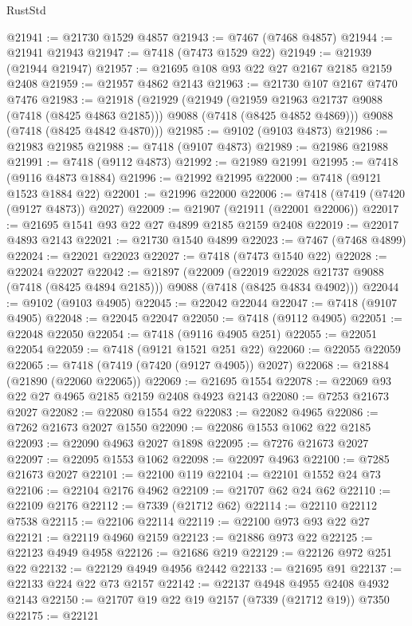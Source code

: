 \begin{lexlean}{RustStd}
\begin{coremodule}
@21941 := @21730 @1529 @4857
@21943 := @7467 (@7468 @4857)
@21944 := @21941 @21943
@21947 := @7418 (@7473 @1529 @22)
@21949 := @21939 (@21944 @21947)
@21957 := @21695 @108 @93 @22 @27 @2167 @2185 @2159 @2408
@21959 := @21957 @4862 @2143
@21963 := @21730 @107 @2167 @7470 @7476
@21983 := @21918
    (@21929
      (@21949
        (@21959 @21963 @21737 @9088 (@7418 (@8425 @4863 @2185)))
        @9088
        (@7418 (@8425 @4852 @4869)))
      @9088
      (@7418 (@8425 @4842 @4870)))
@21985 := @9102 (@9103 @4873)
@21986 := @21983 @21985
@21988 := @7418 (@9107 @4873)
@21989 := @21986 @21988
@21991 := @7418 (@9112 @4873)
@21992 := @21989 @21991
@21995 := @7418 (@9116 @4873 @1884)
@21996 := @21992 @21995
@22000 := @7418 (@9121 @1523 @1884 @22)
@22001 := @21996 @22000
@22006 := @7418 (@7419 (@7420 (@9127 @4873)) @2027)
@22009 := @21907 (@21911 (@22001 @22006))
@22017 := @21695 @1541 @93 @22 @27 @4899 @2185 @2159 @2408
@22019 := @22017 @4893 @2143
@22021 := @21730 @1540 @4899
@22023 := @7467 (@7468 @4899)
@22024 := @22021 @22023
@22027 := @7418 (@7473 @1540 @22)
@22028 := @22024 @22027
@22042 := @21897
    (@22009
      (@22019 @22028 @21737 @9088 (@7418 (@8425 @4894 @2185)))
      @9088
      (@7418 (@8425 @4834 @4902)))
@22044 := @9102 (@9103 @4905)
@22045 := @22042 @22044
@22047 := @7418 (@9107 @4905)
@22048 := @22045 @22047
@22050 := @7418 (@9112 @4905)
@22051 := @22048 @22050
@22054 := @7418 (@9116 @4905 @251)
@22055 := @22051 @22054
@22059 := @7418 (@9121 @1521 @251 @22)
@22060 := @22055 @22059
@22065 := @7418 (@7419 (@7420 (@9127 @4905)) @2027)
@22068 := @21884 (@21890 (@22060 @22065))
@22069 := @21695 @1554
@22078 := @22069 @93 @22 @27 @4965 @2185 @2159 @2408 @4923 @2143
@22080 := @7253 @21673 @2027
@22082 := @22080 @1554 @22
@22083 := @22082 @4965
@22086 := @7262 @21673 @2027 @1550
@22090 := @22086 @1553 @1062 @22 @2185
@22093 := @22090 @4963 @2027 @1898
@22095 := @7276 @21673 @2027
@22097 := @22095 @1553 @1062
@22098 := @22097 @4963
@22100 := @7285 @21673 @2027
@22101 := @22100 @119
@22104 := @22101 @1552 @24 @73
@22106 := @22104 @2176 @4962
@22109 := @21707 @62 @24 @62
@22110 := @22109 @2176
@22112 := @7339 (@21712 @62)
@22114 := @22110 @22112 @7538
@22115 := @22106 @22114
@22119 := @22100 @973 @93 @22 @27
@22121 := @22119 @4960 @2159
@22123 := @21886 @973 @22
@22125 := @22123 @4949 @4958
@22126 := @21686 @219
@22129 := @22126 @972 @251 @22
@22132 := @22129 @4949 @4956 @2442
@22133 := @21695 @91
@22137 := @22133 @224 @22 @73 @2157
@22142 := @22137 @4948 @4955 @2408 @4932 @2143
@22150 := @21707 @19 @22 @19 @2157 (@7339 (@21712 @19)) @7350
@22175 := @22121

\end{coremodule}
\end{lexlean}
